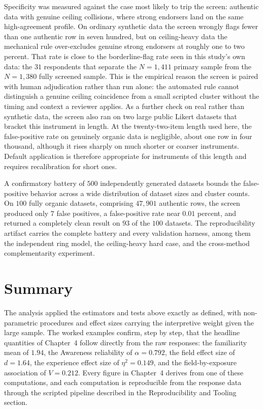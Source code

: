 Specificity was measured against the case most likely to trip the screen: authentic data with genuine ceiling collisions, where strong endorsers land on the same high-agreement profile. On ordinary synthetic data the screen wrongly flags fewer than one authentic row in seven hundred, but on ceiling-heavy data the mechanical rule over-excludes genuine strong endorsers at roughly one to two percent. That rate is close to the borderline-flag rate seen in this study's own data: the $31$ respondents that separate the $N=1{,}411$ primary sample from the $N=1{,}380$ fully screened sample. This is the empirical reason the screen is paired with human adjudication rather than run alone: the automated rule cannot distinguish a genuine ceiling coincidence from a small scripted cluster without the timing and context a reviewer applies. As a further check on real rather than synthetic data, the screen also ran on two large public Likert datasets that bracket this instrument in length. At the twenty-two-item length used here, the false-positive rate on genuinely organic data is negligible, about one row in four thousand, although it rises sharply on much shorter or coarser instruments. Default application is therefore appropriate for instruments of this length and requires recalibration for short ones.

A confirmatory battery of $500$ independently generated datasets bounds the false-positive behavior across a wide distribution of dataset sizes and cluster counts. On $100$ fully organic datasets, comprising $47{,}901$ authentic rows, the screen produced only $7$ false positives, a false-positive rate near $0.01$ percent, and returned a completely clean result on $93$ of the $100$ datasets. The reproducibility artifact carries the complete battery and every validation harness, among them the independent ring model, the ceiling-heavy hard case, and the cross-method complementarity experiment.

\section{Summary}

The analysis applied the estimators and tests above exactly as defined, with non-parametric procedures and effect sizes carrying the interpretive weight given the large sample. The worked examples confirm, step by step, that the headline quantities of Chapter~4 follow directly from the raw responses: the familiarity mean of $1.94$, the Awareness reliability of $\alpha=0.792$, the field effect size of $d=1.64$, the experience effect size of $\eta^2=0.149$, and the field-by-exposure association of $V=0.212$. Every figure in Chapter~4 derives from one of these computations, and each computation is reproducible from the response data through the scripted pipeline described in the Reproducibility and Tooling section.


